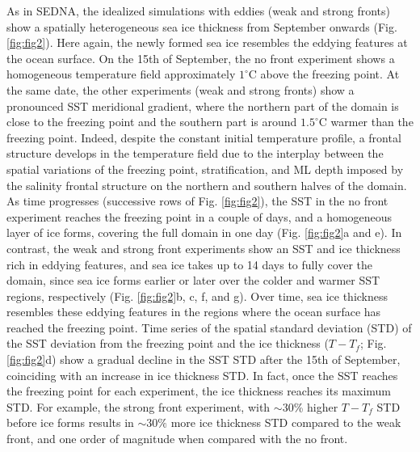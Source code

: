 \documentclass[draft]{agujournal2019}
\begin{document}
As in SEDNA, the idealized simulations with eddies (weak and strong fronts) show a spatially heterogeneous sea ice thickness from September onwards (Fig. \ref{fig:fig2}). Here again, the newly formed sea ice resembles the eddying features at the ocean surface. 
On the 15th of September, the no front experiment shows a homogeneous temperature field approximately $1^\circ$C above the freezing point. At the same date, the other experiments (weak and strong fronts) show a pronounced SST meridional gradient, where the northern part of the domain is close to the freezing point and the southern part is around $1.5^\circ$C warmer than the freezing point. Indeed, despite the constant initial temperature profile, a frontal structure develops in the temperature field due to the interplay between the spatial variations of the freezing point, stratification, and ML depth imposed by the salinity frontal structure on the northern and southern halves of the domain.
As time progresses (successive rows of Fig. \ref{fig:fig2}), the SST in the no front experiment reaches the freezing point in a couple of days, and a homogeneous layer of ice forms, covering the full domain in one day (Fig. \ref{fig:fig2}a and e). In contrast, the weak and strong front experiments show an SST and ice thickness rich in eddying features, and sea ice takes up to 14 days to fully cover the domain, since sea ice forms earlier or later over the colder and warmer SST regions, respectively (Fig. \ref{fig:fig2}b, c, f, and g). Over time, sea ice thickness resembles these eddying features in the regions where the ocean surface has reached the freezing point. 
Time series of the spatial standard deviation (STD) of the SST deviation from the freezing point and the ice thickness ($T-T_f$; Fig. \ref{fig:fig2}d) show a gradual decline in the SST STD after the 15th of September, coinciding with an increase in ice thickness STD. In fact, once the SST reaches the freezing point for each experiment, the ice thickness reaches its maximum STD. For example, the strong front experiment, with $\sim 30$\% higher $T-T_f$ STD before ice forms results in $\sim 30\%$ more ice thickness STD compared to the weak front, and one order of magnitude when compared with the no front. 
\end{document}
